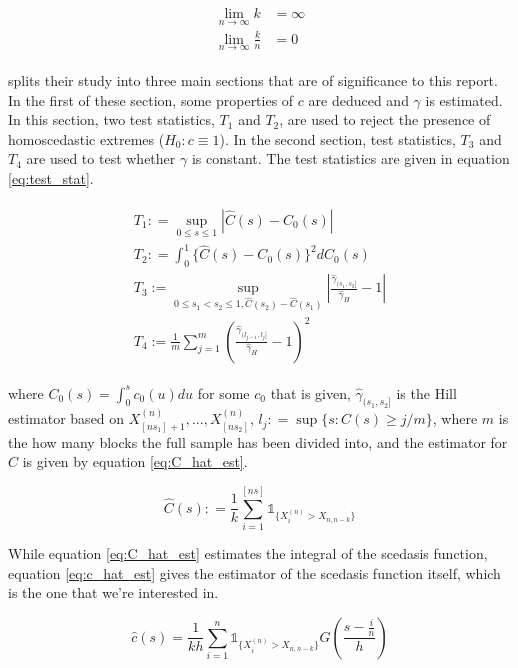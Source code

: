 \documentclass[a4paper]{article}
\begin{document}
\begin{align*} 
\begin{split}
\lim_{n \rightarrow \infty} k &= \infty \\
\lim_{n \rightarrow \infty} \frac{k}{n} &= 0
\end{split}
\end{align*}

\cite{einmahl16} splits their study into three main sections that are of significance to this report. In the first of these section, some properties of $c$ are deduced and $\gamma$ is estimated. In this section, two test statistics, $T_1$ and $T_2$, are used to reject the presence of homoscedastic extremes ($H_0: c \equiv 1$). In the second section, test statistics, $T_3$ and $T_4$ are used to test whether $\gamma$ is constant. The test statistics are given in equation \ref{eq:test_stat}.

\begin{align} \label{eq:test_stat}
\begin{split}
T_1 : = \sup_{0 \le s \le 1} |\hat{C}(s) - C_0(s)|\\
T_2 : = \int_0^1 \{\hat{C}(s) - C_0(s)\}^2 dC_0(s)\\
T_3 := \sup_{0 \le s_1 < s_2 \le 1, \hat{C}(s_2) - \hat{C}(s_1)}|\frac{\hat{\gamma}_{(s_1,s_2]}}{\hat{\gamma}_H} -1| \\
T_4 := \frac{1}{m} \sum_{j=1}^m (\frac{\hat{\gamma}_{(l_{j-1},l_j]}}{\hat{\gamma}_H}-1)^2
\end{split}
\end{align}

\noindent where $C_0(s) = \int_0^s c_0(u)du$ for some $c_0$ that is given, $\hat{\gamma}_{(s_1,s_2]}$ is the Hill estimator based on $X_{[ns_1]+1}^{(n)}, ... , X_{[ns_2]}^{(n)}$,  $l_j : = \sup\{s: \hat{C}(s) \ge j/m\}$, where $m$ is the how many blocks the full sample has been divided into, and the estimator for $C$ is given by equation \ref{eq:C_hat_est}.


\begin{equation} \label{eq:C_hat_est}
\hat{C}(s) : = \frac{1}{k} \sum_{i=1}^{[ns]} \mathbb{1}_{\{X_i^{(n)} > X_{n,n-k}\}}
\end{equation}

While equation \ref{eq:C_hat_est} estimates the integral of the scedasis function, equation \ref{eq:c_hat_est} gives the estimator of the scedasis function itself, which is the one that we're interested in.

\begin{equation} \label{eq:c_hat_est}
\hat{c}(s) = \frac{1}{kh} \sum_{i=1}^n \mathbb{1}_{\{X_i^{(n)} > X_{n,n-k}\}}G(\frac{s-\frac{i}{n}}{h})
\end{equation}
\end{document}
